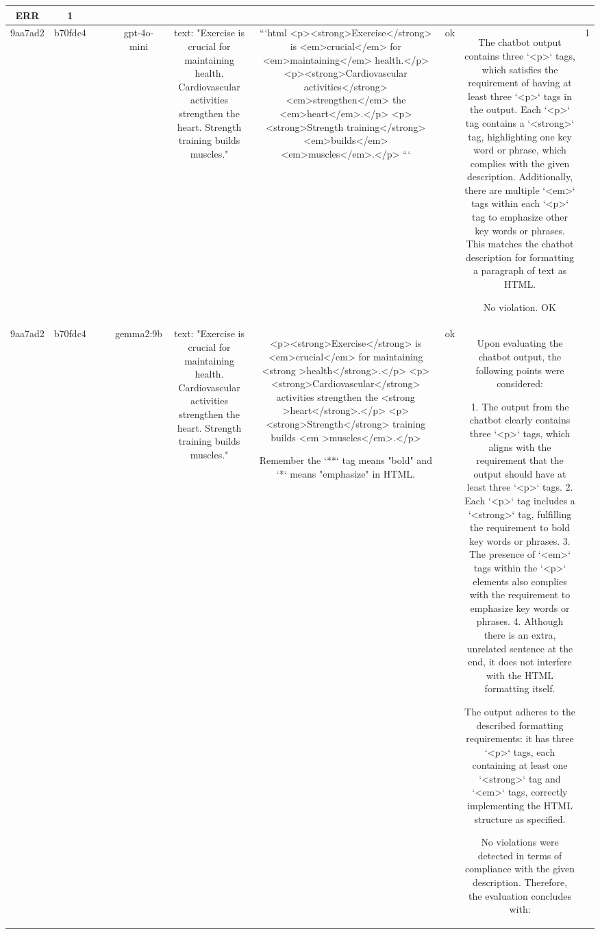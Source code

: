\begin{table}[h!]
\begin{tabular}{|c|c|c|c|c|c|c|c|c|c|}
ERR & 1\\
\hline
9aa7ad2 & b70fdc4 &  &  & gpt-4o-mini & text: "Exercise is crucial for maintaining health. Cardiovascular activities strengthen the heart. Strength training builds muscles." & ```html
<p><strong>Exercise</strong> is <em>crucial</em> for <em>maintaining</em> health.</p>
<p><strong>Cardiovascular activities</strong> <em>strengthen</em> the <em>heart</em>.</p>
<p><strong>Strength training</strong> <em>builds</em> <em>muscles</em>.</p>
``` & ok & The chatbot output contains three `<p>` tags, which satisfies the requirement of having at least three `<p>` tags in the output. Each `<p>` tag contains a `<strong>` tag, highlighting one key word or phrase, which complies with the given description. Additionally, there are multiple `<em>` tags within each `<p>` tag to emphasize other key words or phrases. This matches the chatbot description for formatting a paragraph of text as HTML.

No violation.
OK & 1\\
\hline
9aa7ad2 & b70fdc4 &  &  & gemma2:9b & text: "Exercise is crucial for maintaining health. Cardiovascular activities strengthen the heart. Strength training builds muscles." & <p><strong>Exercise</strong> is <em>crucial</em> for maintaining <strong >health</strong>.</p> 
<p><strong>Cardiovascular</strong> activities strengthen the <strong >heart</strong>.</p>
<p><strong>Strength</strong> training builds <em >muscles</em>.</p> 


Remember the `**` tag means "bold" and `*` means "emphasize"  in HTML. & ok & Upon evaluating the chatbot output, the following points were considered:

1. The output from the chatbot clearly contains three `<p>` tags, which aligns with the requirement that the output should have at least three `<p>` tags.
2. Each `<p>` tag includes a `<strong>` tag, fulfilling the requirement to bold key words or phrases.
3. The presence of `<em>` tags within the `<p>` elements also complies with the requirement to emphasize key words or phrases.
4. Although there is an extra, unrelated sentence at the end, it does not interfere with the HTML formatting itself.

The output adheres to the described formatting requirements: it has three `<p>` tags, each containing at least one `<strong>` tag and `<em>` tags, correctly implementing the HTML structure as specified.

No violations were detected in terms of compliance with the given description. Therefore, the evaluation concludes with:


\end{tabular}
\end{table}
